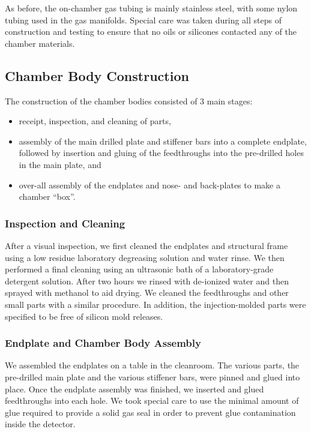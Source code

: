 As before, the on-chamber gas tubing is mainly stainless steel, with some
nylon tubing used in the gas manifolds.  Special care was taken during
all steps of construction and testing to ensure that no oils or
silicones contacted any of the chamber materials.

\subsection{Chamber Body Construction}

The construction of the chamber bodies consisted of 3 main stages:
\begin{itemize}
\item receipt, inspection, and cleaning of parts,
\item assembly of the main drilled plate and stiffener bars into a complete endplate,
followed by insertion and gluing of the feedthroughs into the pre-drilled holes 
in the main plate, and 
\item over-all assembly of the endplates and nose- and back-plates to make
a chamber ``box''.
\end{itemize}

\subsubsection{Inspection and Cleaning}

After a visual inspection, we first cleaned the endplates and structural 
frame using a low residue laboratory degreasing solution and water rinse.
We then performed a final cleaning using an ultrasonic bath of a laboratory-grade detergent solution.  
After two hours we rinsed with de-ionized water and then sprayed 
with methanol to aid drying.
We cleaned the feedthroughs and other small parts with a similar procedure.
In addition, the injection-molded parts were specified to be free of silicon 
mold releases.
 
\subsubsection{Endplate and Chamber Body Assembly}

We assembled the endplates on a table in the cleanroom.  The various parts,
the pre-drilled main plate and the various stiffener bars, were pinned
and glued into place.  Once the endplate assembly was finished,
we inserted and glued feedthroughs into each hole.  We took special care 
to use the minimal amount of glue required to provide a solid gas 
seal in order to prevent glue contamination inside the detector. 

